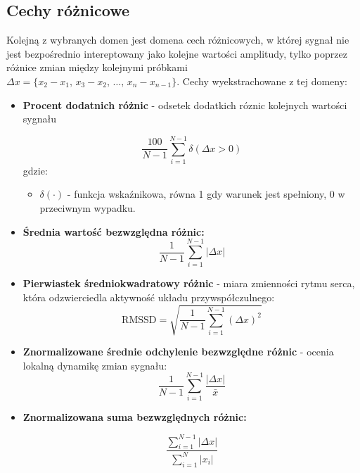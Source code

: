 \documentclass[a4paper,twoside,12pt]{book}
\begin{document}
\subsection{Cechy różnicowe}
Kolejną z wybranych domen jest domena cech różnicowych, w której sygnał nie jest bezpośrednio intereptowany jako kolejne wartości amplitudy, tylko poprzez różnice zmian między kolejnymi próbkami $\Delta x = \{x_2 - x_1,\, x_3 - x_2,\, \ldots,\, x_n - x_{n-1}\}$. Cechy wyekstrachowane z tej domeny:
\begin{itemize}
	\setcounter{enumi}{4}
	\item \textbf{Procent dodatnich różnic} - odsetek dodatkich róznic kolejnych wartości sygnału

	      \begin{equation}
		      \frac{100}{N-1} \sum_{i=1}^{N-1} \delta(\Delta x > 0)
	      \end{equation}
	      gdzie:
	      \begin{itemize}
		      \item \( \delta(\cdot) \) - funkcja wskaźnikowa, równa 1 gdy warunek jest spełniony, 0 w przeciwnym wypadku.
	      \end{itemize}
	\item \textbf{Średnia wartość bezwzględna różnic:}
	      \begin{equation}
		      \frac{1}{N-1} \sum_{i=1}^{N-1} |\Delta x|
	      \end{equation}

	\item \textbf{Pierwiastek średniokwadratowy różnic} - miara zmienności rytmu serca, która odzwierciedla aktywność układu przywspółczulnego:\cite{Farokhipour2023}
	      \begin{equation}
		      \text{RMSSD} = \sqrt{ \frac{1}{N-1} \sum_{i=1}^{N-1} (\Delta x)^2 }
	      \end{equation}

	\item \textbf{Znormalizowane średnie odchylenie bezwzględne różnic} - ocenia lokalną dynamikę zmian sygnału:
	      \begin{equation}
		      \frac{1}{N-1} \sum_{i=1}^{N-1} \frac{|\Delta x|}{\bar{x}}
	      \end{equation}

	\item \textbf{Znormalizowana suma bezwzględnych różnic:}

	      \begin{equation}
		      \frac{\sum_{i=1}^{N-1} |\Delta x|}{\sum_{i=1}^{N} |x_i|}
	      \end{equation}

\end{itemize}
\end{document}
